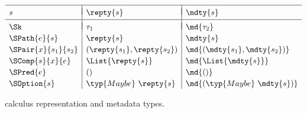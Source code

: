 \begin{figure}
\[
\begin{array}{l|l|l}
\hline
& & \\[-.85em]
s & \repty{s} & \mdty{s} \\[.5ex]
\hline
& & \\[-.85em]
\Sk & \tau_1 &  \md{\tau_2} \\[.5ex]
\SPath{e}{s} & \repty{s} & \mdty{s} \\[.5ex]
\SPair{x}{s_1}{s_2} & (\repty{s_1}, \repty{s_2}) & \md{(\mdty{s_1}, \mdty{s_2})} \\[.5ex]
\SComp{s}{x}{e} & \List{\repty{s}} & \md{\List{\mdty{s}}}\\[.5ex]
\SPred{e} & () & \md{()}\\[.5ex]
\SOption{s} & \typ{Maybe}~\repty{s} & \md{(\typ{Maybe}~\mdty{s})} 
\end{array}
\]
\caption{\forest{} calculus representation and metadata types.}
\label{fig:ctypes}
\end{figure}

